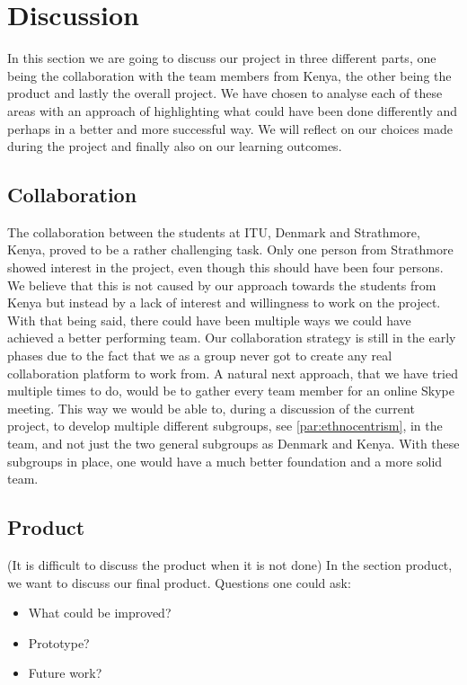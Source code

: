 \section{Discussion}
In this section we are going to discuss our project in three different parts, one being the collaboration with the team members from Kenya, the other being the product and lastly the overall project. We have chosen to analyse each of these areas with an approach of highlighting what could have been done differently and perhaps in a better and more successful way. We will reflect on our choices made during the project and finally also on our learning outcomes.

\subsection{Collaboration}
The collaboration between the students at ITU, Denmark and Strathmore, Kenya, proved to be a rather challenging task. Only one person from Strathmore showed interest in the project, even though this should have been four persons. We believe that this is not caused by our approach towards the students from Kenya but instead by a lack of interest and willingness to work on the project.
With that being said, there could have been multiple ways we could have achieved a better performing team. Our collaboration strategy is still in the early phases due to the fact that we as a group never got to create any real collaboration platform to work from. 
A natural next approach, that we have tried multiple times to do, would be to gather every team member for an online Skype meeting. This way we would be able to, during a discussion of the current project, to develop multiple different subgroups, see \ref{par:ethnocentrism}, in the team, and not just the two general subgroups as Denmark and Kenya. With these subgroups in place, one would have a much better foundation and a more solid team.

\subsection{Product}
(It is difficult to discuss the product when it is not done)
In the section product, we want to discuss our final product. Questions one could ask:

\begin{itemize}
	\item What could be improved?
	\item Prototype?
	\item Future work?
\end{itemize}


